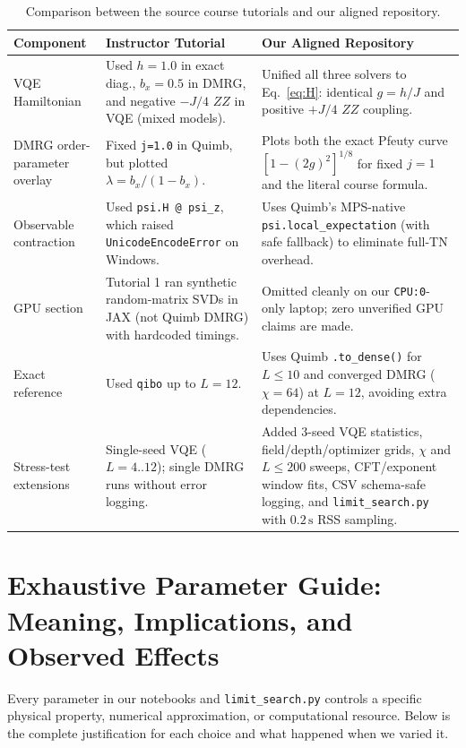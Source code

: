 \documentclass[11pt,a4paper]{article}
\begin{document}
\begin{table}[H]\centering
\caption{Comparison between the source course tutorials and our aligned repository.}
\label{tab:diff}
\small
\begin{tabular}{p{3.0cm} p{5.8cm} p{6.2cm}}
\toprule
\textbf{Component} & \textbf{Instructor Tutorial} & \textbf{Our Aligned Repository} \\
\midrule
VQE Hamiltonian & Used $h=1.0$ in exact diag., $b_x=0.5$ in DMRG, and negative $-J/4$ $ZZ$ in VQE (mixed models). & Unified all three solvers to Eq.~\eqref{eq:H}: identical $g=h/J$ and positive $+J/4$ $ZZ$ coupling. \\
\addlinespace
DMRG order-parameter overlay & Fixed \texttt{j=1.0} in Quimb, but plotted $\lambda = b_x/(1-b_x)$. & Plots both the exact Pfeuty curve $[1-(2g)^2]^{1/8}$ for fixed $j=1$ and the literal course formula. \\
\addlinespace
Observable contraction & Used \texttt{psi.H @ psi\_z}, which raised \texttt{UnicodeEncodeError} on Windows. & Uses Quimb's MPS-native \texttt{psi.local\_expectation} (with safe fallback) to eliminate full-TN overhead. \\
\addlinespace
GPU section & Tutorial 1 ran synthetic random-matrix SVDs in JAX (not Quimb DMRG) with hardcoded timings. & Omitted cleanly on our \texttt{CPU:0}-only laptop; zero unverified GPU claims are made. \\
\addlinespace
Exact reference & Used \texttt{qibo} up to $L=12$. & Uses Quimb \texttt{.to\_dense()} for $L\le 10$ and converged DMRG ($\chi=64$) at $L=12$, avoiding extra dependencies. \\
\addlinespace
Stress-test extensions & Single-seed VQE ($L=4..12$); single DMRG runs without error logging. & Added 3-seed VQE statistics, field/depth/optimizer grids, $\chi$ and $L\le 200$ sweeps, CFT/exponent window fits, CSV schema-safe logging, and \texttt{limit\_search.py} with $0.2\,\mathrm{s}$ RSS sampling. \\
\bottomrule
\end{tabular}
\end{table}

\section{Exhaustive Parameter Guide: Meaning, Implications, and Observed Effects}
Every parameter in our notebooks and \texttt{limit\_search.py} controls a specific physical property, numerical approximation, or computational resource. Below is the complete justification for each choice and what happened when we varied it.
\end{document}

